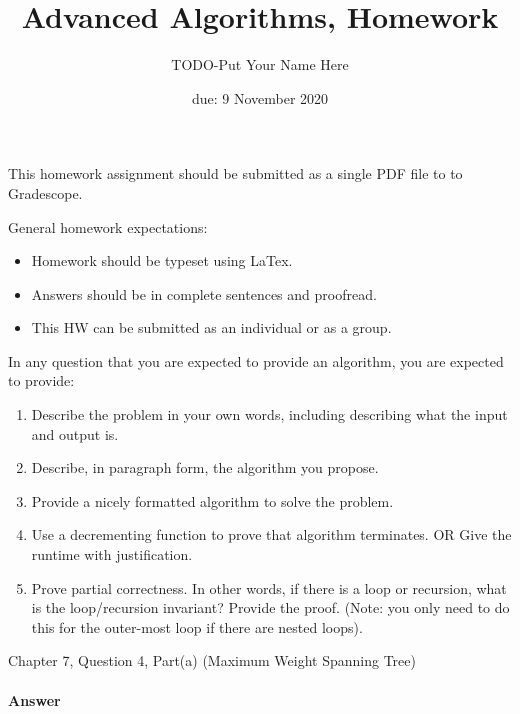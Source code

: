 \documentclass{article}
\title{Advanced Algorithms, Homework \hwnum}
\author{TODO-Put Your Name Here}
\date{due: 9 November 2020}
\begin{document}
\maketitle

This homework assignment should be
submitted as a single PDF file to to Gradescope.

General homework expectations:
\begin{itemize}
    \item Homework should be typeset using LaTex.
    \item Answers should be in complete sentences and proofread.
    \item This HW can be submitted as an individual or as a group.
\end{itemize}

In any question that you are expected to provide an algorithm, you are
expected to provide:
\begin{enumerate}
    \item Describe the problem in your own words, including
        describing what the input and output is.
    \item Describe, in paragraph form, the algorithm you propose.
    \item Provide a nicely formatted algorithm to solve the problem.
    \item Use a decrementing function to prove that algorithm terminates.
            OR  Give the runtime with justification.
    \item Prove partial correctness.  In other words, if there is a loop or
        recursion, what is the loop/recursion invariant? Provide the proof.
        (Note: you only need to do this for the outer-most loop if there are
        nested loops).
\end{enumerate}

\nextprob
{}

Chapter 7, Question 4, Part(a) (Maximum Weight Spanning Tree)

\paragraph{Answer}
\end{document}
